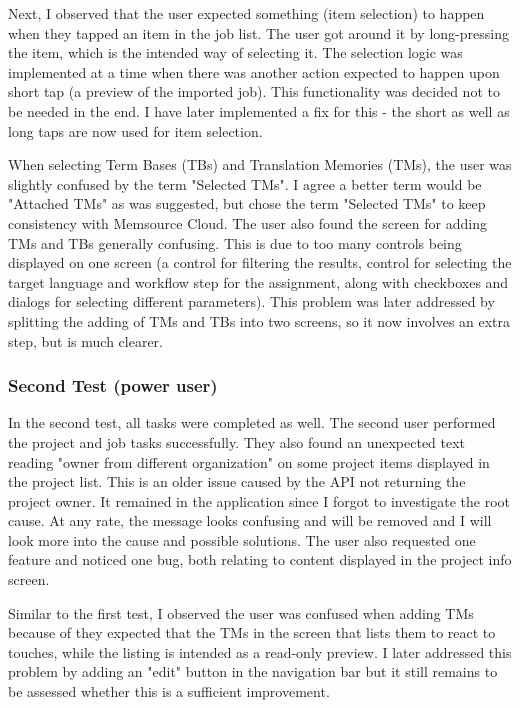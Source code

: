Next, I observed that the user expected something (item selection) to happen when they tapped an item in the job list. The user got around it by long-pressing the item, which is the intended way of selecting it. The selection logic was implemented at a time when there was another action expected to happen upon short tap (a preview of the imported job). This functionality was decided not to be needed in the end. I have later implemented a fix for this - the short as well as long taps are now used for item selection. 


When selecting Term Bases (TBs) and Translation Memories (TMs), the user was slightly confused by the term "Selected TMs". I agree a better term would be "Attached TMs" as was suggested, but chose the term "Selected TMs" to keep consistency with Memsource Cloud. The user also found the screen for adding TMs and TBs generally confusing. This is due to too many controls being displayed on one screen (a control for filtering the results, control for selecting the target language and workflow step for the assignment, along with checkboxes and dialogs for selecting different parameters). This problem was later addressed by splitting the adding of TMs and TBs into two screens, so it now involves an extra step, but is much clearer.


\subsubsection{Second Test (power user)}

In the second test, all tasks were completed as well. The second user performed the project and job tasks successfully. They also found an unexpected text reading "owner from different organization" on some project items displayed in the project list. This is an older issue caused by the API not returning the project owner. It remained in the application since I forgot to investigate the root cause. At any rate, the message looks confusing and will be removed and I will look more into the cause and possible solutions. The user also requested one feature and noticed one bug, both relating to content displayed in the project info screen.

Similar to the first test, I observed the user was confused when adding TMs because of they expected that the TMs in the screen that lists them to react to touches, while the listing is intended as a read-only preview. I later addressed this problem by adding an "edit" button in the navigation bar but it still remains to be assessed whether this is a sufficient improvement.

